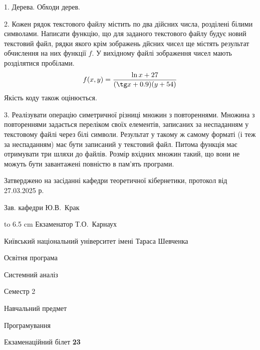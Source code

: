 \documentclass[12pt, ukrainian]{article}
\begin{document}
{%
1. Дерева. Обходи дерев.%
\par
\vspace{2mm}

2. Кожен рядок текстового файлу містить по два дійсних числа, розділені білими символами.
Написати функцію, що для заданого текстового файлу будує новий текстовий файл, рядки якого крім зображень дйсних чисел ще містять результат обчислення на них функції $f$. У вихідному файлі зображення чисел мають розділятися пробілами. 
$$f(x, y) =\frac{\ln x + 27}{(\tg x + 0.9) (y + 54)}$$ 
Якість коду також оцінюється.

\par
\vspace{2mm}

3. Реалізувати операцію симетричної різниці множин з повтореннями. Множина з повтореннями задається переліком своїх елементів, записаних за неспаданням у текстовому файлі через білі символи. Результат у такому ж самому форматі (і теж за неспаданням) має бути записаний у текстовий файл. Питома функція має отримувати три шляхи до файлів. Розмір вхідних множин такий, що вони не можуть бути завантажені повністю в пам’ять програми.

}
{\smallskip\smallskip \begin {scriptsize} Затверджено на засіданні кафедри теоретичної кібернетики, протокол   від   27.03.2025 р.\par\smallskip\smallskip\smallskip\smallskip
{\parbox {6.5 cm} {Зав. кафедри \dotfill Ю.В.~Крак}}\hspace {0.7cm} {\hbox to 6.5 cm { Екзаменатор \dotfill Т.О.~Карнаух}} \end{scriptsize}}
\newpage
{{\begin {scriptsize}\par
{ \center  Київський національний університет імені Тараса Шевченка \par}
{\parbox {5 cm}{Освітня програма \hfill}{\parbox {7 cm}{Системний аналіз\hfill}}\parbox {6 cm}{\hfill Семестр 2}}\par
{\parbox {5 cm} {Навчальний предмет \hfill}\parbox {7 cm}{Програмування \hfill}\parbox {6cm}{\hfill}\par}\vspace{-15pt} \end{scriptsize}}{\center Екзаменаційний білет \No \textbf { 23 }\par}}
\end{document}
